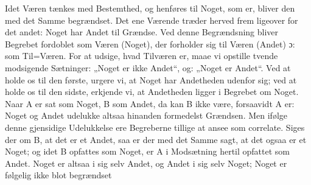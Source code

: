 \documentclass[12pt]{book}
\newcommand{\dsi}{\textup{ɔ:}}
\newcommand{\opage}[1]{\marginnote{\footnotesize\textit{[#1]}}}
\begin{document}
Idet Væren tænkes med Bestemthed, og henføres til Noget, som er, bliver den med det
Samme begrændset. Det ene Værende træder herved frem ligeover for det andet: Noget har
Andet til Grændse. Ved denne Begrændsning bliver Begrebet fordoblet som Væren (Noget),
der forholder sig til Væren (Andet) \dsi{} som Til=Væren. For at udsige, hvad
Tilværen er, maae vi opstille tvende modsigende Sætninger: „Noget er ikke Andet“, og:
„Noget er Andet“. Ved at holde os til den første, urgere vi, at Noget har Andetheden
udenfor sig; ved at holde os til den sidste, erkjende vi, at Andetheden ligger i
Begrebet om Noget. Naar A er sat som Noget, B som Andet, da kan B ikke være,
forsaavidt A er: Noget og Andet udelukke altsaa hinanden formedelst Grændsen. Men
ifølge denne gjensidige Udelukkelse ere Begreberne tillige at ansee som correlate.
Siges der om B, at det er et Andet, saa er der med det Samme sagt, at det ogsaa er et
Noget; og idet B opfattes som Noget, er A i Modsætning hertil opfattet som Andet.
Noget er altsaa i sig selv Andet, og Andet i sig selv Noget; Noget er følgelig ikke
blot begrændset
\opage{117} %
\end{document}

